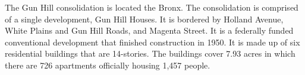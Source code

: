 The Gun Hill consolidation is located the Bronx. The consolidation is comprised of a single development, Gun Hill Houses. It is bordered by Holland Avenue, White Plains and Gun Hill Roads, and Magenta Street.  It is a federally funded conventional development that finished construction in 1950. It is made up of six residential buildings that are 14-stories. The buildings cover 7.93  acres in which there are 726 apartments officially housing 1,457 people.